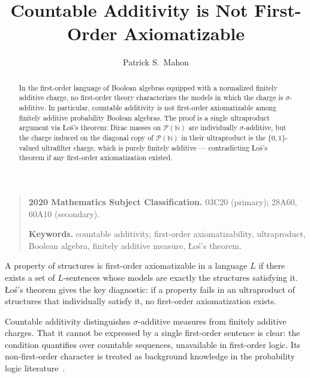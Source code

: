 \documentclass[11pt]{article}
\title{Countable Additivity is Not First-Order Axiomatizable}
\author{Patrick S.\ Mahon}
\date{}
\theoremstyle{definition}
\newcommand{\N}{\mathbb{N}}
\begin{document}
\maketitle

\begin{quote}
\small
\textbf{2020 Mathematics Subject Classification.}
03C20 (primary); 28A60, 60A10 (secondary).

\smallskip
\textbf{Keywords.}
countable additivity, first-order axiomatizability, ultraproduct,
Boolean algebra, finitely additive measure, \L{}o\'s's theorem.
\end{quote}

\begin{abstract}
In the first-order language of Boolean algebras equipped with a normalized finitely
additive charge, no first-order theory characterizes the models in which the charge
is $\sigma$-additive.  In particular, countable additivity is not first-order
axiomatizable among finitely additive probability Boolean algebras.  The proof is a
single ultraproduct argument via \L{}o\'{s}'s theorem: Dirac masses on $\mathcal{P}(\N)$
are individually $\sigma$-additive, but the charge induced on the diagonal copy of
$\mathcal{P}(\N)$ in their ultraproduct is the $\{0,1\}$-valued ultrafilter charge,
which is purely finitely additive --- contradicting \L{}o\'{s}'s theorem if any
first-order axiomatization existed.
\end{abstract}

A property of structures is first-order axiomatizable in a language $L$ if there exists
a set of $L$-sentences whose models are exactly the structures satisfying it.
\L{}o\'{s}'s theorem gives the key diagnostic: if a property fails in an ultraproduct
of structures that individually satisfy it, no first-order axiomatization exists.

Countable additivity distinguishes $\sigma$-additive measures from finitely additive
charges.  That it cannot be expressed by a single first-order sentence is clear: the
condition quantifies over countable sequences, unavailable in first-order logic.  Its
non-first-order character is treated as background knowledge in the probability logic
literature~\cite{Hoover1978,Keisler1985,FaginHalpernMegiddo1990}.
\end{document}
